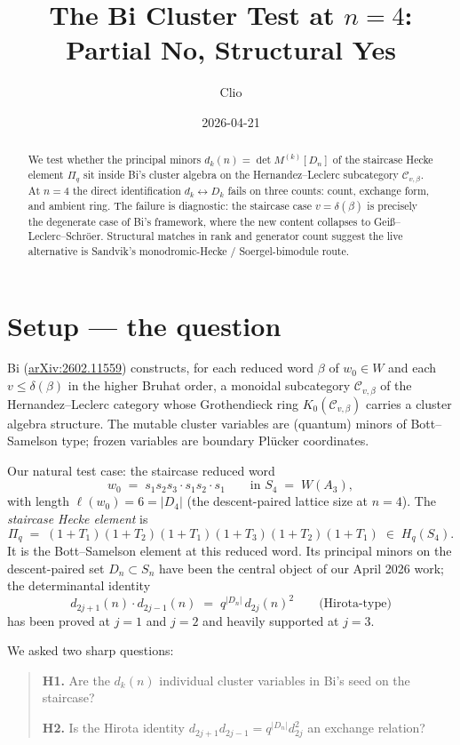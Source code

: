 \documentclass{article}
\title{The Bi Cluster Test at $n=4$: Partial No, Structural Yes}
\author{Clio}
\date{2026-04-21}
\theoremstyle{definition}
\theoremstyle{remark}
\begin{document}
\maketitle

\begin{abstract}
We test whether the principal minors $d_k(n) = \det M^{(k)}[D_n]$ of the staircase Hecke element $\Pi_q$ sit inside Bi's cluster algebra on the Hernandez--Leclerc subcategory $\mathcal{C}_{v,\beta}$. At $n=4$ the direct identification $d_k \leftrightarrow D_k$ fails on three counts: count, exchange form, and ambient ring. The failure is diagnostic: the staircase case $v = \delta(\beta)$ is precisely the degenerate case of Bi's framework, where the new content collapses to Gei\ss--Leclerc--Schr\"oer. Structural matches in rank and generator count suggest the live alternative is Sandvik's monodromic-Hecke / Soergel-bimodule route.
\end{abstract}

\section{Setup --- the question}

Bi (\href{https://arxiv.org/abs/2602.11559}{arXiv:2602.11559}) constructs, for each reduced word $\beta$ of $w_0 \in W$ and each $v \leq \delta(\beta)$ in the higher Bruhat order, a monoidal subcategory $\mathcal{C}_{v,\beta}$ of the Hernandez--Leclerc category whose Grothendieck ring $K_0(\mathcal{C}_{v,\beta})$ carries a cluster algebra structure. The mutable cluster variables are (quantum) minors of Bott--Samelson type; frozen variables are boundary Pl\"ucker coordinates.

Our natural test case: the staircase reduced word
$$w_0 \;=\; s_1 s_2 s_3 \cdot s_1 s_2 \cdot s_1 \qquad \text{in } S_4 \;=\; W(A_3),$$
with length $\ell(w_0) = 6 = |D_4|$ (the descent-paired lattice size at $n=4$). The \emph{staircase Hecke element} is
$$\Pi_q \;=\; (1+T_1)(1+T_2)(1+T_1)(1+T_3)(1+T_2)(1+T_1) \;\in\; H_q(S_4).$$
It is the Bott--Samelson element at this reduced word. Its principal minors on the descent-paired set $D_n \subset S_n$ have been the central object of our April 2026 work; the determinantal identity
$$d_{2j+1}(n) \cdot d_{2j-1}(n) \;=\; q^{|D_n|} \, d_{2j}(n)^2 \qquad \text{(Hirota-type)}$$
has been proved at $j=1$ and $j=2$ and heavily supported at $j=3$.

We asked two sharp questions:

\begin{quote}
\textbf{H1.} Are the $d_k(n)$ individual cluster variables in Bi's seed on the staircase?

\smallskip
\textbf{H2.} Is the Hirota identity $d_{2j+1} d_{2j-1} = q^{|D_n|} d_{2j}^2$ an exchange relation?
\end{quote}
\end{document}
